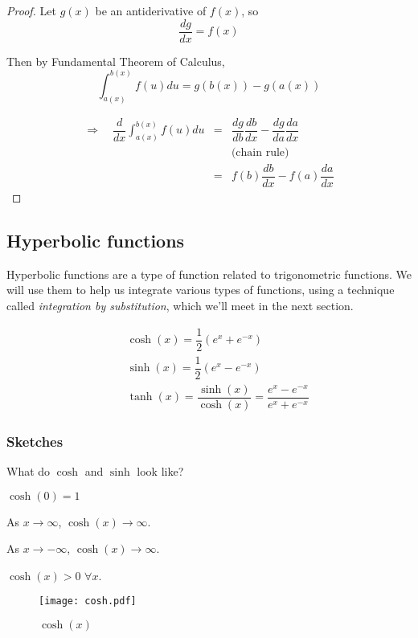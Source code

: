 \begin{proof}
 Let $g(x)$ be an antiderivative of $f(x)$, so
 \[
  \dfrac{dg}{dx} = f(x)
 \]

 Then by Fundamental Theorem of Calculus,
 \[
  \int_{a(x)}^{b(x)} f(u)du = g(b(x))-g(a(x))
 \]

 \begin{eqnarray*}
  \Longrightarrow \quad \dfrac{d}{dx} \int_{a(x)}^{b(x)} f(u)du &=&
  \dfrac{dg}{db} \dfrac{db}{dx} - \dfrac{dg}{da} \dfrac{da}{dx}\\
  && \text{(chain rule)}\\ %
  &=& f(b) \dfrac{db}{dx} - f(a) \dfrac{da}{dx}
 \end{eqnarray*}
\end{proof}



\subsection{Hyperbolic functions}

Hyperbolic functions are a type of function related to trigonometric functions.  We will use them to help us integrate various types of functions, using a technique called \emph{integration by substitution}, which we'll meet in the next section.

\begin{eqnarray*}
 && \cosh (x) = \dfrac{1}{2} (e^{x}+e^{-x})\\
 && \sinh (x) = \dfrac{1}{2} (e^{x}-e^{-x})\\
 && \tanh (x) = \dfrac{\sinh (x)}{\cosh (x)} = \dfrac{e^{x}-e^{-x}}{e^{x}+e^{-x}}
\end{eqnarray*}


\subsubsection*{Sketches}

What do $\cosh$ and $\sinh$ look like?

$\cosh(0)=1$

As $x \to \infty$, $\cosh(x) \to \infty$.

As $x \to -\infty$, $\cosh(x) \to \infty$.

$\cosh (x)>0$ $\forall x$.

\begin{figure}[H]
\centering
 \texttt{[image: cosh.pdf]}
\caption{$\cosh(x)$}
\end{figure}

